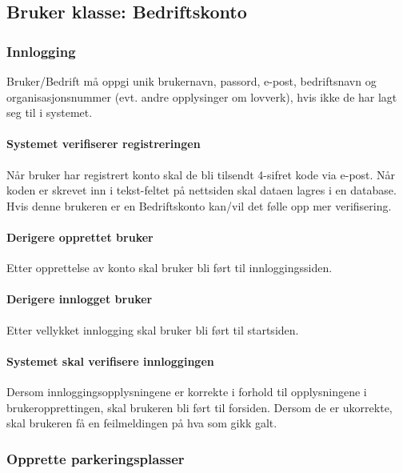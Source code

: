 \documentclass[12pt]{article}
\begin{document}
    \subsection{Bruker klasse: Bedriftskonto}

        \subsubsection{Innlogging}
            Bruker/Bedrift må oppgi unik brukernavn, passord, e-post, bedriftsnavn og organisasjonsnummer (evt. andre opplysinger om lovverk), hvis ikke de har lagt seg til i systemet.

            \paragraph{Systemet verifiserer registreringen}
            Når bruker har registrert konto skal de bli tilsendt 4-sifret kode via e-post. Når koden er skrevet inn i tekst-feltet på nettsiden skal dataen lagres i en database. Hvis denne brukeren er en Bedriftskonto kan/vil det følle opp mer verifisering.

            \paragraph{Derigere opprettet bruker}
            Etter opprettelse av konto skal bruker bli ført til innloggingssiden.

            \paragraph{Derigere innlogget bruker}
            Etter vellykket innlogging skal bruker bli ført til startsiden.

            \paragraph{Systemet skal verifisere innloggingen}
            Dersom innloggingsopplysningene er korrekte i forhold til opplysningene i brukeropprettingen, skal brukeren bli ført til forsiden. Dersom de er ukorrekte, skal brukeren få en feilmeldingen på hva som gikk galt.

        \subsubsection{Opprette parkeringsplasser}
\end{document}
